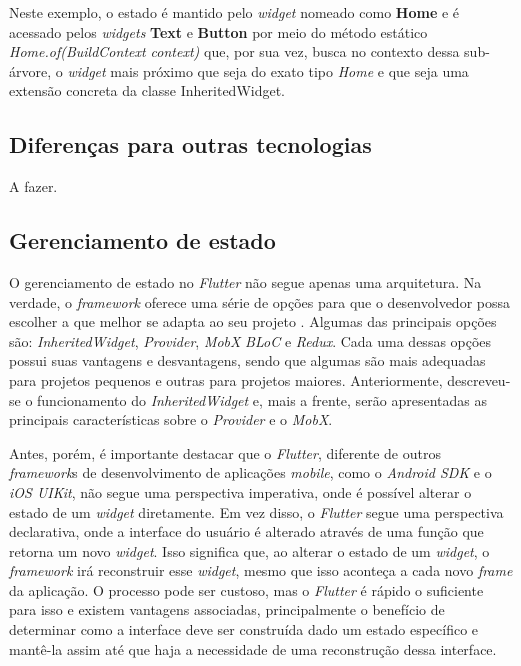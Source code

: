 Neste exemplo, o estado é mantido pelo \textit{widget} nomeado como \textbf{Home} e é acessado pelos \textit{widgets} \textbf{Text} e \textbf{Button} por meio do método estático \textit{Home.of(BuildContext context)} que, por sua vez, busca no contexto dessa sub-árvore, o \textit{widget} mais próximo que seja do exato tipo \textit{Home} e que seja uma extensão concreta da classe InheritedWidget.

\subsection{Diferenças para outras tecnologias}
\label{cap2:Subsec:Diferencas_tecnologias}
A fazer.

\subsection{Gerenciamento de estado}
\label{cap2:Subsec:Gerenciamento_estado}
O gerenciamento de estado no \textit{Flutter} não segue apenas uma arquitetura. Na verdade, o \textit{framework} oferece uma série de opções para que o desenvolvedor possa escolher a que melhor se adapta ao seu projeto \cite{Faust2020}. Algumas das principais opções são: \textit{InheritedWidget}, \textit{Provider}, \textit{MobX} \textit{BLoC} e \textit{Redux}. Cada uma dessas opções possui suas vantagens e desvantagens, sendo que algumas são mais adequadas para projetos pequenos e outras para projetos maiores. Anteriormente, descreveu-se o funcionamento do \textit{InheritedWidget} e, mais a frente, serão apresentadas as principais características sobre o \textit{Provider} e o \textit{MobX}.

Antes, porém, é importante destacar que o \textit{Flutter}, diferente de outros \textit{framework}s de desenvolvimento de aplicações \textit{mobile}, como o \textit{Android SDK} e o \textit{iOS UIKit}, não segue uma perspectiva imperativa, onde é possível alterar o estado de um \textit{widget} diretamente. Em vez disso, o \textit{Flutter} segue uma perspectiva declarativa, onde a interface do usuário é alterado através de uma função que retorna um novo \textit{widget}. Isso significa que, ao alterar o estado de um \textit{widget}, o \textit{framework} irá reconstruir esse \textit{widget}, mesmo que isso aconteça a cada novo \textit{frame} da aplicação. O processo pode ser custoso, mas o \textit{Flutter} é rápido o suficiente para isso e existem vantagens associadas, principalmente o benefício de determinar como a interface deve ser construída dado um estado específico e mantê-la assim até que haja a necessidade de uma reconstrução dessa interface.

